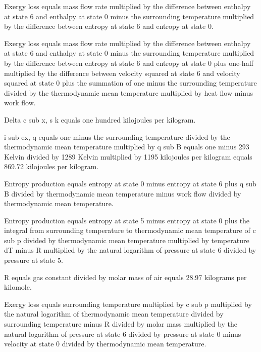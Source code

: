 Exergy loss equals mass flow rate multiplied by the difference between enthalpy at state 6 and enthalpy at state 0 minus the surrounding temperature multiplied by the difference between entropy at state 6 and entropy at state 0.  

Exergy loss equals mass flow rate multiplied by the difference between enthalpy at state 6 and enthalpy at state 0 minus the surrounding temperature multiplied by the difference between entropy at state 6 and entropy at state 0 plus one-half multiplied by the difference between velocity squared at state 6 and velocity squared at state 0 plus the summation of one minus the surrounding temperature divided by the thermodynamic mean temperature multiplied by heat flow minus work flow.  

Delta c sub x, s k equals one hundred kilojoules per kilogram.  

i sub ex, q equals one minus the surrounding temperature divided by the thermodynamic mean temperature multiplied by q sub B equals one minus 293 Kelvin divided by 1289 Kelvin multiplied by 1195 kilojoules per kilogram equals 869.72 kilojoules per kilogram.  

Entropy production equals entropy at state 0 minus entropy at state 6 plus q sub B divided by thermodynamic mean temperature minus work flow divided by thermodynamic mean temperature.  

Entropy production equals entropy at state 5 minus entropy at state 0 plus the integral from surrounding temperature to thermodynamic mean temperature of c sub p divided by thermodynamic mean temperature multiplied by temperature dT minus R multiplied by the natural logarithm of pressure at state 6 divided by pressure at state 5.  

R equals gas constant divided by molar mass of air equals 28.97 kilograms per kilomole.  

Exergy loss equals surrounding temperature multiplied by c sub p multiplied by the natural logarithm of thermodynamic mean temperature divided by surrounding temperature minus R divided by molar mass multiplied by the natural logarithm of pressure at state 6 divided by pressure at state 0 minus velocity at state 0 divided by thermodynamic mean temperature.